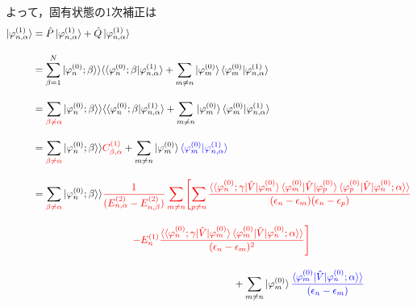






よって，固有状態の1次補正は
\begin{align}
    \ket{\varphi_{n,\alpha}^{(1)}}
    &=\hat{P}\ket{\varphi_{n,\alpha}^{(1)}}+\hat{Q}\ket{\varphi_{n,\alpha}^{(1)}}\nn[10pt]
    &=\sum_{\beta=1}^{N}|\varphi^{(0)}_n;\beta\rangle\rangle
    \langle\langle\varphi^{(0)}_n;\beta|\varphi_{n,\alpha}^{(1)}\rangle
    +\sum_{m\neq n}\ket{\varphi^{(0)}_m}\braket{\varphi^{(0)}_m|\varphi_{n,\alpha}^{(1)}}\nn[10pt]
    &=\sum_{\textcolor{red}{\beta\neq\alpha}}|\varphi^{(0)}_n;\beta\rangle\rangle
    \langle\langle\varphi^{(0)}_n;\beta|\varphi_{n,\alpha}^{(1)}\rangle
    +\sum_{m\neq n}\ket{\varphi^{(0)}_m}\braket{\varphi^{(0)}_m|\varphi_{n,\alpha}^{(1)}}\nn[10pt]
    &=\sum_{\textcolor{red}{\beta\neq\alpha}}|\varphi^{(0)}_n;\beta\rangle\rangle
    \textcolor{red}{C^{(1)}_{\beta,\alpha}}
    +\sum_{m\neq n}\ket{\varphi^{(0)}_m}
    \textcolor{blue}{\braket{\varphi^{(0)}_m|\varphi_{n,\alpha}^{(1)}}}\nn[10pt]
    &=\sum_{\textcolor{red}{\beta\neq\alpha}}|\varphi^{(0)}_n;\beta\rangle\rangle
    \textcolor{red}{\frac{1}{(E^{(2)}_{n,\alpha}-E^{(2)}_{n,\beta})}
    \sum_{m\neq n}\Biggl[\sum_{p\neq n}
    \frac{\langle\braket{\varphi^{(0)}_{n};\gamma|\hat{V}|\varphi^{(0)}_m}
    \langle{\varphi^{(0)}_{m}|\hat{V}|\varphi^{(0)}_p}\rangle
    \braket{\varphi^{(0)}_{p}|\hat{V}|\varphi^{(0)}_n;\alpha}\rangle}
    {(\epsilon_n-\epsilon_m)(\epsilon_n-\epsilon_p)}}\nn[10pt]
    &\hspace{100pt}
    \textcolor{red}{-E^{(1)}_n
    \frac{\langle\braket{\varphi^{(0)}_{n};\gamma|\hat{V}|\varphi^{(0)}_m}
    \braket{\varphi^{(0)}_{m}|\hat{V}|\varphi^{(0)}_n;\alpha}\rangle}{(\epsilon_n-\epsilon_m)^2}
    \Biggr]}
    \nn[10pt]
    &\hspace{200pt}+
    \sum_{m\neq n}\ket{\varphi^{(0)}_m}
    \textcolor{blue}{
    \frac{\braket{\varphi^{(0)}_{m}|\hat{V}|\varphi^{(0)}_n;\alpha}\rangle}{(\epsilon_n-\epsilon_m)}}
\end{align}

